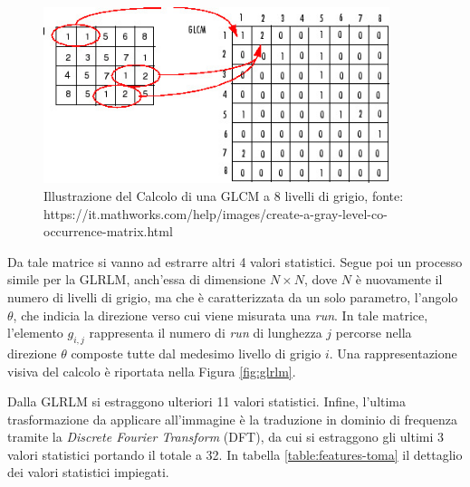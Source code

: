 \begin{figure}[h]
    \center
    \includegraphics[width=0.9\textwidth]{./assets/glcm.jpg}
    \caption{Illustrazione del Calcolo di una GLCM a 8 livelli di grigio, fonte: https://it.mathworks.com/help/images/create-a-gray-level-co-occurrence-matrix.html}
\end{figure}

Da tale matrice si vanno ad estrarre altri 4 valori statistici.
Segue poi un processo simile per la GLRLM, anch'essa di dimensione
$N \times N$, dove $N$ è nuovamente il numero di livelli di grigio,
ma che è caratterizzata da un solo parametro, l'angolo $\theta$,
che indicia la direzione verso cui viene misurata una {\it run}.
In tale matrice, l'elemento $g_{i,j}$ rappresenta il numero di {\it run}
di lunghezza $j$ percorse nella direzione $\theta$ composte tutte dal medesimo
livello di grigio $i$.
Una rappresentazione visiva del calcolo è riportata nella Figura \ref{fig:glrlm}.


Dalla GLRLM si estraggono ulteriori 11 valori statistici.
Infine, l'ultima trasformazione da applicare all'immagine è la traduzione in
dominio di frequenza tramite la {\it Discrete Fourier Transform} (DFT), da cui
si estraggono gli ultimi 3 valori statistici portando il totale a 32.
In tabella \ref{table:features-toma} il dettaglio dei valori statistici impiegati.

